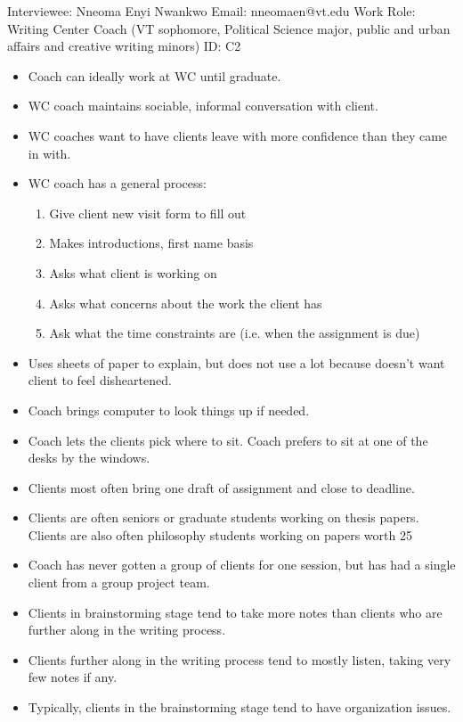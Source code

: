 \documentclass[12pt]{article} %
\begin{document}
    Interviewee: Nneoma Enyi Nwankwo
    Email: nneomaen@vt.edu
    Work Role: Writing Center Coach (VT sophomore, Political Science major, public and urban affairs and creative writing minors)
    ID: C2
    
  \begin{itemize}
    \item Coach can ideally work at WC until graduate.
    \item WC coach maintains sociable, informal conversation with client. 
    \item WC coaches want to have clients leave with more confidence than they came in with.
    \item WC coach has a general process:
    \begin{enumerate}
    \item	Give client new visit form to fill out
    \item	Makes introductions, first name basis
    \item	Asks what client is working on
    \item	Asks what concerns about the work the client has
    \item	Ask what the time constraints are (i.e. when the assignment is due)
    \end{enumerate}
    \item Uses sheets of paper to explain, but does not use a lot because doesn’t want client to feel disheartened.
    \item Coach brings computer to look things up if needed. 
    \item Coach lets the clients pick where to sit.  Coach prefers to sit at one of the desks by the windows.
    \item Clients most often bring one draft of assignment and close to deadline. 
    \item Clients are often seniors or graduate students working on thesis papers.  Clients are also often philosophy students working on papers worth 25%
    \item Coach has never gotten a group of clients for one session, but has had a single client from a group project team.
    \item Clients in brainstorming stage tend to take more notes than clients who are further along in the writing process. 
    \item Clients further along in the writing process tend to mostly listen, taking very few notes if any.
    \item Typically, clients in the brainstorming stage tend to have organization issues. 

\end{itemize}
\end{document}

